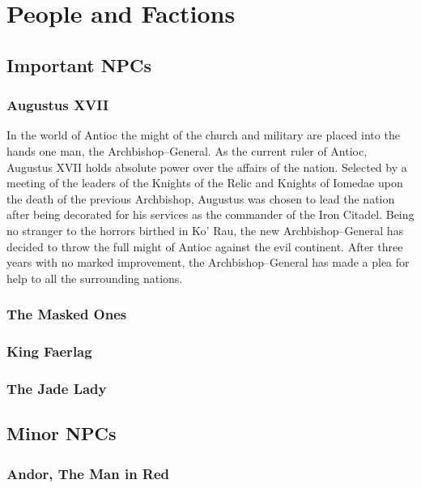 \section{People and Factions}
	
	\subsection{Important NPCs}

		\subsubsection{Augustus XVII}
			In the world of Antioc the might of the church and military are 
			placed into the hands one man, the Archbishop--General.  As the 
			current ruler of Antioc, Augustus XVII holds absolute power over
			the affairs of the nation.  Selected by a meeting of the leaders
			of the Knights of the Relic and Knights of Iomedae upon the death 
			of the previous Archbishop, Augustus was chosen to lead the nation
			after being decorated for his services as the commander of the Iron
			Citadel.  Being no stranger to the horrors birthed in Ko' Rau,  
			the new Archbishop--General has decided to throw the full might of 
			Antioc against the evil continent.  After three years with no 
			marked improvement, the Archbishop--General has made a plea for 
			help to all the surrounding nations.

		\subsubsection{The Masked Ones}
			
		\subsubsection{King Faerlag}

		\subsubsection{The Jade Lady}

	\subsection{Minor NPCs}

		\subsubsection{Andor, The Man in Red}

